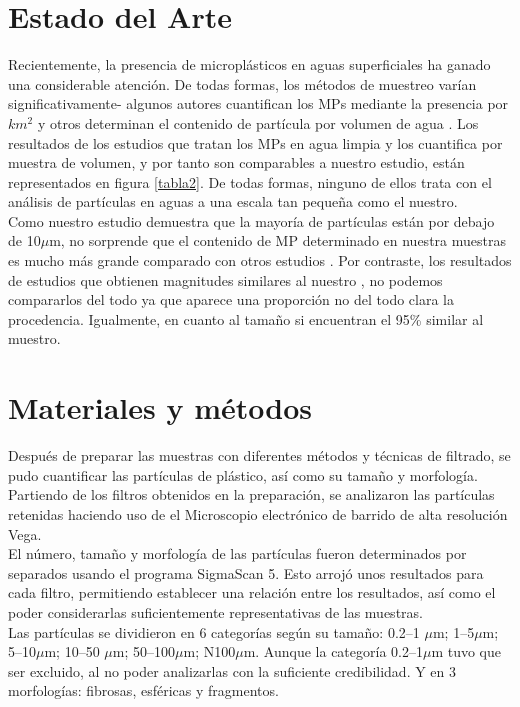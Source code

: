 \documentclass[a4paper,11pt]{article}
\begin{document}
\section{Estado del Arte}
	Recientemente, la presencia de microplásticos en aguas superficiales ha ganado una considerable atención. De todas formas, los métodos de muestreo varían significativamente- algunos autores cuantifican los MPs mediante la presencia por $km^{2}$ \cite{Su2016} y otros determinan el contenido de partícula por volumen de agua \cite{Di2018}. Los resultados de los estudios que tratan los MPs en agua limpia y los cuantifica por muestra de volumen, y por tanto son comparables a nuestro estudio, están representados en figura \ref{tabla2}. De todas formas, ninguno de ellos trata con el análisis de partículas en aguas a una escala tan pequeña como el nuestro. \\
	Como nuestro estudio demuestra que la mayoría de partículas están por debajo de 10$\mu$m, no sorprende que el contenido de MP determinado en nuestra muestras es mucho más grande comparado con otros estudios \cite{Su2016}. Por contraste, los resultados de estudios que obtienen magnitudes similares al nuestro \cite{Osmann2018}, no podemos compararlos del todo ya que aparece una proporción no del todo clara la procedencia. Igualmente, en cuanto al tamaño si encuentran el 95\% similar al muestro.
	
\section{Materiales y métodos}
	Después de preparar las muestras con diferentes métodos y técnicas de filtrado, se pudo cuantificar las partículas de plástico, así como su tamaño y morfología.\\
	Partiendo de los filtros obtenidos en la preparación, se analizaron las partículas retenidas haciendo uso de el Microscopio electrónico de barrido de alta resolución Vega.\\
	El número, tamaño y morfología de las partículas fueron determinados por separados usando el programa SigmaScan 5. Esto arrojó unos resultados para cada filtro, permitiendo establecer una relación entre los resultados, así como el poder considerarlas suficientemente representativas de las muestras.\\
	Las partículas se dividieron en 6 categorías según su tamaño: 0.2–1 $\mu$m; 1–5$\mu$m; 5–10$\mu$m; 10–50 $\mu$m; 50–100$\mu$m; N100$\mu$m.
	Aunque la categoría 0.2–1$\mu$m tuvo que ser excluido, al no poder analizarlas con la suficiente credibilidad.
	Y en 3 morfologías: fibrosas, esféricas y fragmentos.
\end{document}
